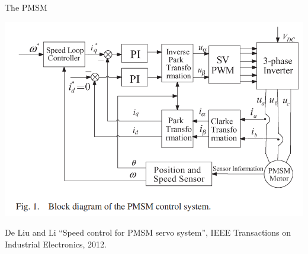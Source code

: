 \documentclass[presentation,aspectratio=1610]{beamer}
\begin{document}
\begin{frame}[label={sec:orgb40e192}]{The PMSM}
\begin{center}
\includegraphics[width=0.8\linewidth]{../../figures/pmsm_control_block_diag.png}
\end{center}
{\footnotesize De Liu and Li  ``Speed control for PMSM servo system'', IEEE Transactions on Industrial Electronics, 2012.}
\end{frame}
\end{document}
